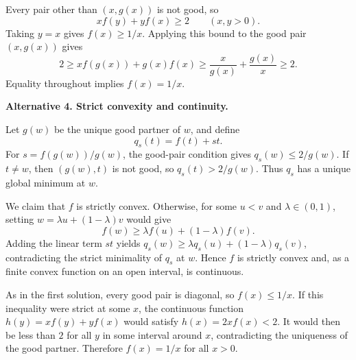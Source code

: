 \begin{dlsummary}[title={\bfseries Solution 17. IMO 2022 Shortlist -- Algebra A3},breakable]
Every pair other than $(x,g(x))$ is not good, so
\[
xf(y)+yf(x)\geq2\qquad(x,y>0).
\]
Taking $y=x$ gives $f(x)\geq1/x$. Applying this bound to the good pair
$(x,g(x))$ gives
\[
2\geq xf(g(x))+g(x)f(x)
\geq\frac{x}{g(x)}+\frac{g(x)}{x}\geq2.
\]
Equality throughout implies $f(x)=1/x$.

\medskip
\noindent
\textbf{Alternative 4. Strict convexity and continuity.}

Let $g(w)$ be the unique good partner of $w$, and define
\[
q_s(t)=f(t)+st.
\]
For $s=f(g(w))/g(w)$, the good-pair condition gives
$q_s(w)\leq2/g(w)$. If $t\ne w$, then $(g(w),t)$ is not good, so
$q_s(t)>2/g(w)$. Thus $q_s$ has a unique global minimum at $w$.

We claim that $f$ is strictly convex. Otherwise, for some $u<v$ and
$\lambda\in(0,1)$, setting $w=\lambda u+(1-\lambda)v$ would give
\[
f(w)\geq\lambda f(u)+(1-\lambda)f(v).
\]
Adding the linear term $st$ yields
$q_s(w)\geq\lambda q_s(u)+(1-\lambda)q_s(v)$, contradicting the
strict minimality of $q_s$ at $w$. Hence $f$ is strictly convex and, as
a finite convex function on an open interval, is continuous.

As in the first solution, every good pair is diagonal, so $f(x)\leq1/x$.
If this inequality were strict at some $x$, the continuous function
$h(y)=xf(y)+yf(x)$ would satisfy $h(x)=2xf(x)<2$. It would then be less
than $2$ for all $y$ in some interval around $x$, contradicting the
uniqueness of the good partner. Therefore $f(x)=1/x$ for all $x>0$.

\end{dlsummary}